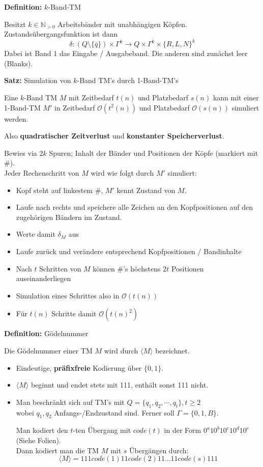 \documentclass[a4paper,graphics,11pt]{article}
\begin{document}
\textbf{Definition:} $k$-Band-TM

Besitzt $k \in \mathbb{N}_{>0}$ Arbeitsbänder mit unabhängigen Köpfen.
Zustandsübergangsfunktion ist dann
$$
    \delta : (Q\setminus \{\overline{q}\}) \times \Gamma^k \to Q \times \Gamma^k \times \{R,L,N\}^k
$$
Dabei ist Band 1 das Eingabe / Ausgabeband. Die anderen sind zunächst leer (Blanks).

\strut

\textbf{Satz:} Simulation von $k$-Band TM's durch 1-Band-TM's

Eine $k$-Band TM $M$ mit Zeitbedarf $t(n)$ und Platzbedarf $s(n)$ kann mit einer 1-Band-TM $M'$
in Zeitbedarf $\mathcal{O}(t^2(n))$ und Platzbedarf $\mathcal{O}(s(n))$ simuliert werden.

Also \textbf{quadratischer Zeitverlust} und \textbf{konstanter Speicherverlust}.

Bewies via $2k$ Spuren; Inhalt der Bänder und Positionen der Köpfe (markiert mit \#).\\
Jeder Rechenschritt von $M$ wird wie folgt durch $M'$ simuliert:
\begin{itemize}
    \item Kopf steht auf linkestem \#, $M'$ kennt Zustand von $M$.
    \item Laufe nach rechts und speichere alle Zeichen an den Kopfpositionen auf den
        zugehörigen Bändern
        im Zustand.
    \item Werte damit $\delta_M$ aus
    \item Laufe zurück und verändere entsprechend Kopfpositionen / Bandinhalte
    \\
    \item Nach $t$ Schritten von $M$ können \#'s höchstens $2t$ Positionen auseinanderliegen
    \item Simulation eines Schrittes also in $\mathcal{O}(t(n))$
    \item Für $t(n)$ Schritte damit $\mathcal{O}(t(n)^2)$
\end{itemize}

\newpage

\textbf{Definition:} Gödelnummer

Die Gödelnummer einer TM $M$ wird durch $\langle M \rangle$ bezeichnet.

\begin{itemize}
    \item Eindeutige, \textbf{präfixfreie} Kodierung über $\{0,1\}$.
    \item $\langle M \rangle$ beginnt und endet stets mit 111, enthält sonst 111 nicht.
    \item Man beschränkt sich auf TM's mit $Q= \{q_1,q_2,\cdots,q_t\}, t \geq 2$\\
        wobei $q_1,q_2$ Anfangs-/Endzustand sind. Ferner soll $\Gamma = \{0,1,B\}$.

        Man kodiert den $t$-ten Übergang mit $code(t)$ in der Form $0^a10^b10^c10^d10^e$
        (Siehe Folien).\\
        Dann kodiert man die TM $M$ mit $s$ Übergängen durch:
        $$
            \langle M \rangle = 111code(1)11code(2)11\dots 11code(s)111
        $$
\end{itemize}
\end{document}

